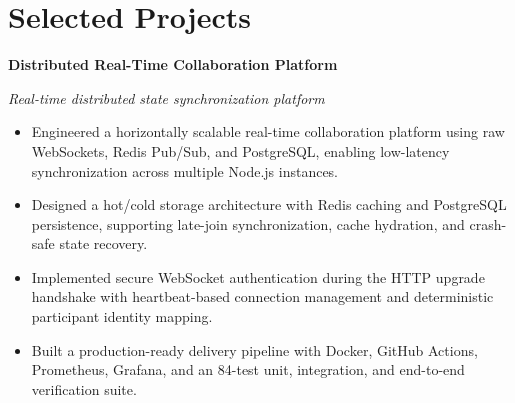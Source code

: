 \section*{Selected Projects}

\textbf{Distributed Real-Time Collaboration Platform}

\textit{Real-time distributed state synchronization platform}

\begin{itemize}[leftmargin=*]

\item Engineered a horizontally scalable real-time collaboration platform using raw WebSockets, Redis Pub/Sub, and PostgreSQL, enabling low-latency synchronization across multiple Node.js instances.

\item Designed a hot/cold storage architecture with Redis caching and PostgreSQL persistence, supporting late-join synchronization, cache hydration, and crash-safe state recovery.

\item Implemented secure WebSocket authentication during the HTTP upgrade handshake with heartbeat-based connection management and deterministic participant identity mapping.

\item Built a production-ready delivery pipeline with Docker, GitHub Actions, Prometheus, Grafana, and an 84-test unit, integration, and end-to-end verification suite.

\end{itemize}
